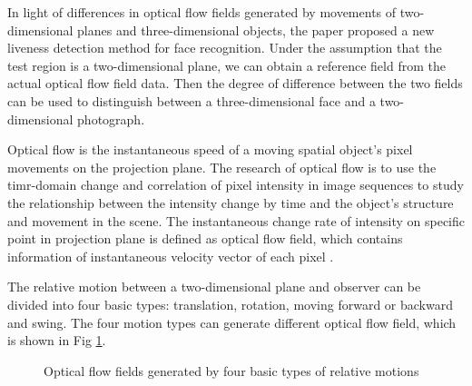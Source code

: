 \documentclass[journal]{IEEEtran}
\begin{document}
In light of differences in optical flow fields generated by movements of two-dimensional planes and three-dimensional objects, the paper \cite{Bao2009A} proposed a new liveness detection method for face recognition. Under the assumption that the test region is a two-dimensional plane, we can obtain a reference field from the actual optical flow field data. Then the degree of difference between the two fields can be used to distinguish between a three-dimensional face and a two-dimensional photograph.

Optical flow is the instantaneous speed of a moving spatial object's pixel movements on the projection plane. The research of optical flow is to use the timr-domain change and correlation of pixel intensity in image sequences to study the relationship between the intensity change by time and the object's structure and movement in the scene. The instantaneous change rate of intensity on specific point in projection plane is defined as optical flow field, which contains information of instantaneous velocity vector of each pixel \cite{Barron1994Performance}.

The relative motion between a two-dimensional plane and observer can be divided into four basic types: translation, rotation, moving forward or backward and swing. The four motion types can generate different optical flow field, which is shown in Fig \ref{fig_C_1}.

\begin{figure}[!t]
\centering
{}
\caption{Optical flow fields generated by four basic types of relative motions}
\label{fig_C_1}
\end{figure}
\end{document}
